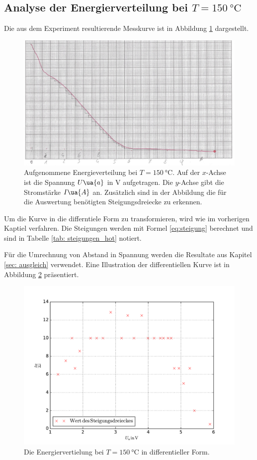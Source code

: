 \subsection{Analyse der Energierverteilung bei $T=\SI{150}{\celsius}$}\label{sec:en_hot}
\FloatBarrier
Die aus dem Experiment resultierende Messkurve ist in Abbildung \ref{fig: messkurve_energie_hot} dargestellt. \\
\begin{figure}
  \centering
  \includegraphics[width=0.8 \textwidth]{./pics/energieverteilung_hot.png}
  \caption{Aufgenommene Energieverteilung bei $T=\SI{150}{\celsius}$. Auf der $x$-Achse ist die Spannung $U\ua{a}$ in $\si{\volt}$ aufgetragen.
          Die $y$-Achse gibt die Stromstärke $I\ua{A}$ an. Zusätzlich sind in der Abbildung die für die Auswertung benötigten Steigungsdreiecke zu erkennen.} %
  \label{fig: messkurve_energie_hot}
\end{figure}
Um die Kurve in die differntiele Form zu transformieren, wird wie im vorherigen Kaptiel verfahren. %
Die Steigungen werden mit Formel \eqref{eq:steigung} berechnet und sind in Tabelle \ref{tab: steigungen_hot} notiert. %

Für die Umrechnung von Abstand in Spannung werden die Resultate aus Kapitel \ref{sec: ausgleich} verwendet.
Eine Illustration der differentiellen Kurve ist in Abbildung \ref{fig: energie_hot_diff} präsentiert. %
\begin{figure}
  \centering
  \includegraphics[width=0.9 \textwidth]{../Messdaten/energie_hot.pdf}
  \caption{Die Energiervertielung bei $T=\SI{150}{\celsius}$ in differentieller Form.}
  \label{fig: energie_hot_diff}
\end{figure}

